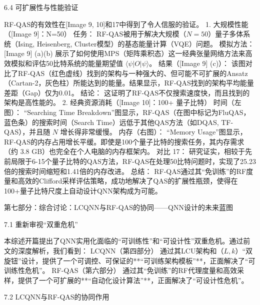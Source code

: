 \documentclass[12pt,a4paper]{article}
\begin{document}
6.4 可扩展性与性能验证

RF-QAS的有效性在[Image 9, 10]和17中得到了令人信服的验证。
1. 大规模性能（[Image 9]：N=50）
任务： RF-QAS被用于解决大规模（$N=50$）量子多体系统（Ising, Heisenberg, Cluster模型）的基态能量计算（VQE）问题。
模拟方法： [Image 9] (a)(b) 展示了如何使用MPS（矩阵乘积态）这一经典张量网络方法来高效模拟和评估50比特系统的能量期望值 $\langle \psi | O | \psi \rangle$。
结果（[Image 9] (c)）： 该图对比了RF-QAS（红色虚线）找到的架构与一种强大的、但可能不可扩展的Ansatz（Cartan-2，灰色柱）所能达到的能量。结果显示，RF-QAS找到的架构平均能量差距（Gap）仅为0.01。
结论： 这证明了RF-QAS不仅搜索速度快，而且找到的架构是高性能的。
2. 经典资源消耗（[Image 10]：100+ 量子比特）
时间（左图）： “Searching Time Breakdown”图显示，RF-QAS（在图中标记为FluQAS，蓝色条）的搜索时间（Search Time）远低于其他QAS方法（如DQAS, TF-QAS），并且随 $N$ 增长得非常缓慢。
内存（右图）： “Memory Usage”图显示，RF-QAS的内存占用增长平缓。即使是100个量子比特的搜索任务，其内存需求（约 3.8 GB）也完全在个人电脑的内存框架内。
对比 17： 研究证实，相较于先前局限于6-15个量子比特的QAS方法，RF-QAS在处理50比特问题时，实现了25.23倍的搜索时间缩短和1.41倍的内存改进。
总结： RF-QAS通过其“免训练”的RF度量和高效的Clifford采样评估策略，成功地解决了QAS的扩展性瓶颈，使得在100+量子比特尺度上自动设计QNN架构成为可能。

第七部分：综合讨论：LCQNN与RF-QAS的协同——QNN设计的未来蓝图


7.1 重新审视“双重危机”

本综述开篇提出了QNN实用化面临的“可训练性”和“可设计性”双重危机。通过前文的深度解析，我们看到：
LCQNN（第四部分） 通过其LCU架构和（$L, k$）“双旋钮”设计，提供了一个可调控、可保证的**“可训练架构模板”**，正面解决了“可训练性危机”。
RF-QAS（第六部分） 通过其“免训练”的RF代理度量和高效采样，提供了一个可扩展的**“自动化设计算法”**，正面解决了“可设计性危机”。

7.2 LCQNN与RF-QAS的协同作用
\end{document}
